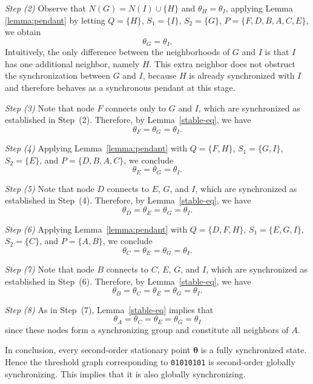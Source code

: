 \documentclass[11pt,reqno]{amsart}
\theoremstyle{definition}
\begin{document}
\textit{Step (2)} Observe that $N(G)=N(I)\cup \{H\}$ and $\theta_H=\theta_I$, applying Lemma \ref{lemma:pendant} by letting $Q=\{H\}$, $S_1=\{I\}$, $S_2=\{G\}$, $P=\{F,D,B,A,C,E\}$, we obtain $$\theta_G=\theta_I.$$ Intuitively, the only difference between the neighborhoods of $G$ and $I$  is that $I$ has one additional neighbor, namely $H$.  This extra neighbor does not obstruct the synchronization between $G$ and $I$,  because $H$ is already synchronized with $I$ and therefore behaves as a synchronous pendant at this stage.

\textit{Step (3)} Note that node $F$ connects only to $G$ and $I$, which are synchronized as established in Step~(2). 
Therefore, by Lemma~\ref{stable-eq}, we have 
$$\theta_F = \theta_G = \theta_I.$$

\textit{Step (4)}
Applying Lemma~\ref{lemma:pendant} with 
$Q=\{F,H\}$, $S_1=\{G,I\}$, $S_2=\{E\}$, and $P=\{D,B,A,C\}$, 
we conclude $$\theta_E=\theta_G=\theta_I.$$

\textit{Step (5)} Note that node $D$ connects to $E$, $G$, and $I$, which are synchronized as established in Step~(4). 
Therefore, by Lemma~\ref{stable-eq}, we have 
$$\theta_D = \theta_E = \theta_G = \theta_I.$$

\textit{Step (6)} 
Applying Lemma~\ref{lemma:pendant} with 
$Q=\{D,F,H\}$, $S_1=\{E,G,I\}$, $S_2=\{C\}$, and $P=\{A,B\}$,
we conclude $$\theta_C=\theta_E=\theta_G=\theta_I.$$

\textit{Step (7)} Note that node $B$ connects to $C$, $E$, $G$, and $I$, which are synchronized as established in Step~(6). 
Therefore, by Lemma~\ref{stable-eq}, we have 
$$\theta_B = \theta_C = \theta_E = \theta_G = \theta_I.$$

\textit{Step (8)} As in Step~(7), Lemma~\ref{stable-eq} implies that $$\theta_A=\theta_C=\theta_E=\theta_G=\theta_I$$ since these nodes form a synchronizing group and constitute all neighbors of $A$.

In conclusion, every second-order stationary point $\boldsymbol{\theta}$ is a fully synchronized state. Hence the threshold graph corresponding to \texttt{01010101} is second-order globally synchronizing. This implies that it is also globally synchronizing.
\end{document}
